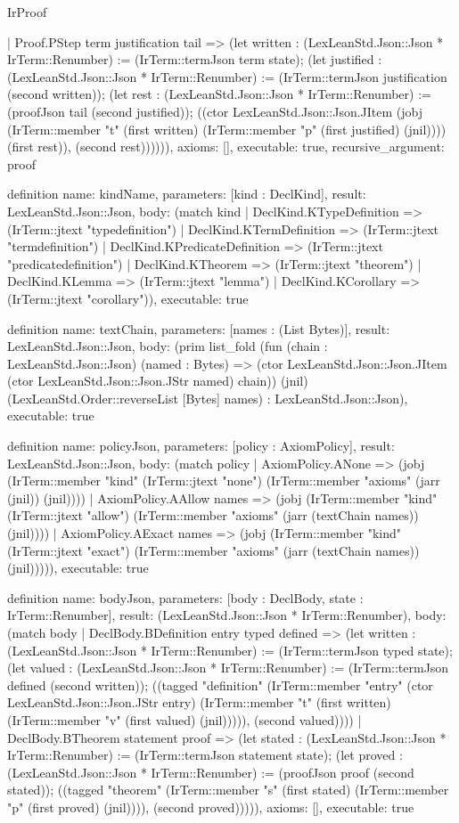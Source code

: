 \begin{lexlean}{IrProof}
\begin{semanticmodule}
{    | Proof.PStep term justification tail => (let written : (LexLeanStd.Json::Json * IrTerm::Renumber) := (IrTerm::termJson term state); (let justified : (LexLeanStd.Json::Json * IrTerm::Renumber) := (IrTerm::termJson justification (second written)); (let rest : (LexLeanStd.Json::Json * IrTerm::Renumber) := (proofJson tail (second justified)); ((ctor LexLeanStd.Json::Json.JItem (jobj (IrTerm::member "t" (first written) (IrTerm::member "p" (first justified) (jnil)))) (first rest)), (second rest)))))),
  axioms: [],
  executable: true,
  recursive_argument: proof
}

definition{
  name: kindName,
  parameters: [kind : DeclKind],
  result: LexLeanStd.Json::Json,
  body: (match kind
    | DeclKind.KTypeDefinition => (IrTerm::jtext "typedefinition")
    | DeclKind.KTermDefinition => (IrTerm::jtext "termdefinition")
    | DeclKind.KPredicateDefinition => (IrTerm::jtext "predicatedefinition")
    | DeclKind.KTheorem => (IrTerm::jtext "theorem")
    | DeclKind.KLemma => (IrTerm::jtext "lemma")
    | DeclKind.KCorollary => (IrTerm::jtext "corollary")),
  executable: true
}

definition{
  name: textChain,
  parameters: [names : (List Bytes)],
  result: LexLeanStd.Json::Json,
  body: (prim list_fold (fun (chain : LexLeanStd.Json::Json) (named : Bytes) => (ctor LexLeanStd.Json::Json.JItem (ctor LexLeanStd.Json::Json.JStr named) chain)) (jnil) (LexLeanStd.Order::reverseList [Bytes] names) : LexLeanStd.Json::Json),
  executable: true
}

definition{
  name: policyJson,
  parameters: [policy : AxiomPolicy],
  result: LexLeanStd.Json::Json,
  body: (match policy
    | AxiomPolicy.ANone => (jobj (IrTerm::member "kind" (IrTerm::jtext "none") (IrTerm::member "axioms" (jarr (jnil)) (jnil))))
    | AxiomPolicy.AAllow names => (jobj (IrTerm::member "kind" (IrTerm::jtext "allow") (IrTerm::member "axioms" (jarr (textChain names)) (jnil))))
    | AxiomPolicy.AExact names => (jobj (IrTerm::member "kind" (IrTerm::jtext "exact") (IrTerm::member "axioms" (jarr (textChain names)) (jnil))))),
  executable: true
}

definition{
  name: bodyJson,
  parameters: [body : DeclBody, state : IrTerm::Renumber],
  result: (LexLeanStd.Json::Json * IrTerm::Renumber),
  body: (match body
    | DeclBody.BDefinition entry typed defined => (let written : (LexLeanStd.Json::Json * IrTerm::Renumber) := (IrTerm::termJson typed state); (let valued : (LexLeanStd.Json::Json * IrTerm::Renumber) := (IrTerm::termJson defined (second written)); ((tagged "definition" (IrTerm::member "entry" (ctor LexLeanStd.Json::Json.JStr entry) (IrTerm::member "t" (first written) (IrTerm::member "v" (first valued) (jnil))))), (second valued))))
    | DeclBody.BTheorem statement proof => (let stated : (LexLeanStd.Json::Json * IrTerm::Renumber) := (IrTerm::termJson statement state); (let proved : (LexLeanStd.Json::Json * IrTerm::Renumber) := (proofJson proof (second stated)); ((tagged "theorem" (IrTerm::member "s" (first stated) (IrTerm::member "p" (first proved) (jnil)))), (second proved))))),
  axioms: [],
  executable: true
}


\end{semanticmodule}
\end{lexlean}
